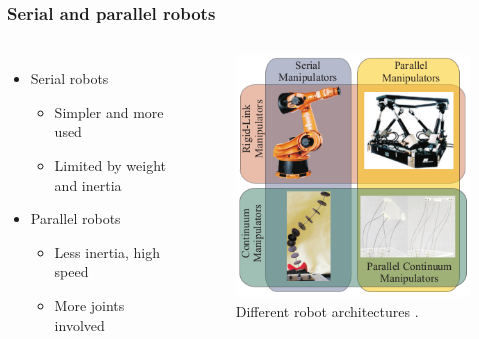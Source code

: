 \documentclass[compress]{thesisbeamer}
\begin{document}
        \begin{frame}
        	\frametitle{Serial and parallel robots}
            \begin{columns}
			\begin{itemize}%
  				\item Serial robots
  				\begin{itemize}%
   					\item Simpler and more used
   					\item Limited by weight and inertia
  				\end{itemize}\vfill
  				\item Parallel robots
  				\begin{itemize}%
   					\item Less inertia, high speed
   					\item More joints involved
  				\end{itemize}\vfill
 			\end{itemize}
			\begin{figure}[h]
				\centering
				\includegraphics[width=\textwidth]{images/serial_parall_robots}
				\caption{Different robot architectures \cite{bryson_toward_2014}.}	
			\end{figure}
			\end{columns}
		\end{frame}
\end{document}
